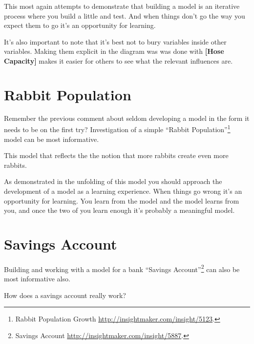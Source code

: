 \documentclass[]{memoir}
\newcommand{\p}[1]{\textbf{{[}#1{]}}}
\begin{document}
This most again attempts to demonstrate that building a model is an
iterative process where you build a little and test. And when things
don't go the way you expect them to go it's an opportunity for learning.

It's also important to note that it's best not to bury variables inside
other variables. Making them explicit in the diagram was was done with
\p{Hose Capacity} makes it easier for others to see what the relevant
influences are.

\section{Rabbit Population}

Remember the previous comment about seldom developing a model in the
form it needs to be on the first try? Investigation of a simple ``Rabbit
Population''\footnote{Rabbit Population Growth
  \url{http://insightmaker.com/insight/5123}.} model can be most
informative.

\FloatBarrier 

\begin{model}[frametitle={Model: Rabbit Population}] 

 This model that reflects the the notion that more rabbits create even more rabbits.




 \end{model}

As demonstrated in the unfolding of this model you should approach the
development of a model as a learning experience. When things go wrong
it's an opportunity for learning. You learn from the model and the model
learns from you, and once the two of you learn enough it's probably a
meaningful model.

\section{Savings Account}

Building and working with a model for a bank ``Savings
Account''\footnote{Savings Account
  \url{http://insightmaker.com/insight/5887}.} can also be most
informative also.

\FloatBarrier 

\begin{model}[frametitle={Model: Savings Account}] 

 How does a savings account really work?




 \end{model}
\end{document}
